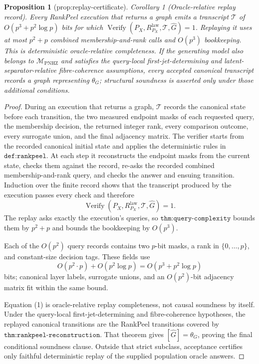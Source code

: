 \documentclass{article}
\newtheorem{proposition}{Proposition}
\begin{document}
\begin{proposition}[prop:replay-certificate]\label{prop:replay-certificate}
Corollary 1 (Oracle-relative replay record).  Every RankPeel execution that returns a graph emits a transcript \(\mathcal T\) of \(O(p^3+p^2\log p)\) bits for which \(\operatorname{Verify}(P_X,R^{\mathrm{law}}_{P_X},\mathcal T,\widehat G)=1\).  Replaying it uses at most \(p^2+p\) combined membership-and-rank calls and \(O(p^3)\) bookkeeping.  This is deterministic oracle-relative completeness.  If the generating model also belongs to \(\mathcal M_{\mathrm{PNHZ}}\) and satisfies the query-local first-jet-determining and latent-separator-relative fibre-coherence assumptions, every accepted canonical transcript records a graph representing \(\theta_G\); structural soundness is asserted only under those additional conditions.
\end{proposition}
\begin{proof}
During an execution that returns a graph, \(\mathcal T\) records the canonical state before each transition, the two measured endpoint masks of each requested query, the membership decision, the returned integer rank, every comparison outcome, every surrogate union, and the final adjacency matrix.  The verifier starts from the recorded canonical initial state and applies the deterministic rules in \(\texttt{def:rankpeel}\).  At each step it reconstructs the endpoint masks from the current state, checks them against the record, re-asks the recorded combined membership-and-rank query, and checks the answer and ensuing transition.  Induction over the finite record shows that the transcript produced by the execution passes every check and therefore
\[
 \operatorname{Verify}(P_X,R^{\mathrm{law}}_{P_X},\mathcal T,\widehat G)=1. \tag{1}
\]
The replay asks exactly the execution's queries, so \(\texttt{thm:query-complexity}\) bounds them by \(p^2+p\) and bounds the bookkeeping by \(O(p^3)\).

Each of the \(O(p^2)\) query records contains two \(p\)-bit masks, a rank in \(\{0,\ldots,p\}\), and constant-size decision tags.  These fields use
\[
 O(p^2\cdot p)+O(p^2\log p)=O(p^3+p^2\log p) \tag{2}
\]
bits; canonical layer labels, surrogate unions, and an \(O(p^2)\)-bit adjacency matrix fit within the same bound.

Equation (1) is oracle-relative replay completeness, not causal soundness by itself.  Under the query-local first-jet-determining and fibre-coherence hypotheses, the replayed canonical transitions are the RankPeel transitions covered by \(\texttt{thm:rankpeel-reconstruction}\).  That theorem gives \([\widehat G]=\theta_G\), proving the final conditional soundness clause.  Outside that strict subclass, acceptance certifies only faithful deterministic replay of the supplied population oracle answers.
\end{proof}
\end{document}
